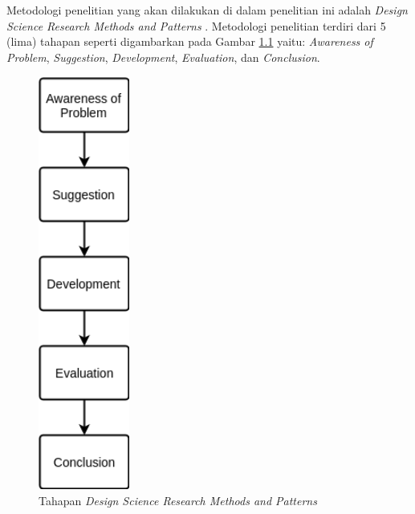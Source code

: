 \chapter{\babTiga}


Metodologi penelitian yang akan dilakukan di dalam penelitian ini adalah \textit{Design Science Research Methods and Patterns} \citep{vaishnavi_design_2007}. Metodologi penelitian terdiri dari 5 (lima) tahapan seperti digambarkan pada Gambar \ref{fig:design-science-research-methodology} yaitu: \textit{Awareness of Problem}, \textit{Suggestion}, \textit{Development}, \textit{Evaluation}, dan \textit{Conclusion}.


\begin{figure}[h]
	\centering
	\includegraphics[width=3cm]{Resources/Images/design-science-research-methodology}
	\caption{Tahapan \textit{Design Science Research Methods and Patterns}}
	\label{fig:design-science-research-methodology}
\end{figure}


